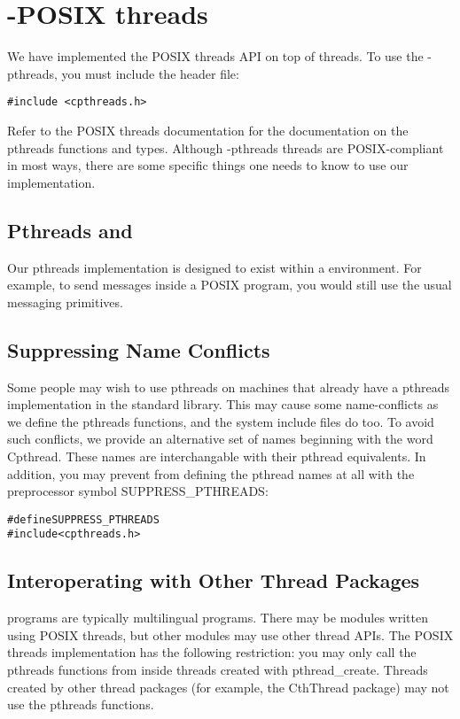 \chapter{\converse{}-POSIX threads}

We have implemented the POSIX threads API on top of \converse{} threads.
To use the \converse{}-pthreads, you must include the header file:

\verb/#include <cpthreads.h>/

Refer to the POSIX threads documentation for the documentation on the
pthreads functions and types.  Although \converse{}-pthreads threads are
POSIX-compliant in most ways, there are some specific things one needs
to know to use our implementation.

\section{Pthreads and \converse{}}

Our pthreads implementation is designed to exist within a \converse{}
environment.  For example, to send messages inside a POSIX program,
you would still use the usual \converse{} messaging primitives.

\section{Suppressing Name Conflicts}

Some people may wish to use \converse{} pthreads on machines that already
have a pthreads implementation in the standard library.  This may
cause some name-conflicts as we define the pthreads functions, and the
system include files do too.  To avoid such conflicts, we provide an
alternative set of names beginning with the word Cpthread.  These
names are interchangable with their pthread equivalents.  In addition,
you may prevent \converse{} from defining the pthread names at all with
the preprocessor symbol SUPPRESS\_PTHREADS:

\begin{alltt}
#define SUPPRESS_PTHREADS
#include <cpthreads.h>
\end{alltt}

\section{Interoperating with Other Thread Packages}

\converse{} programs are typically multilingual programs.  There may be
modules written using POSIX threads, but other modules may use other
thread APIs.  The POSIX threads implementation has the following
restriction: you may only call the pthreads functions from inside
threads created with pthread\_create.  Threads created by other thread
packages (for example, the CthThread package) may not use the pthreads
functions.

